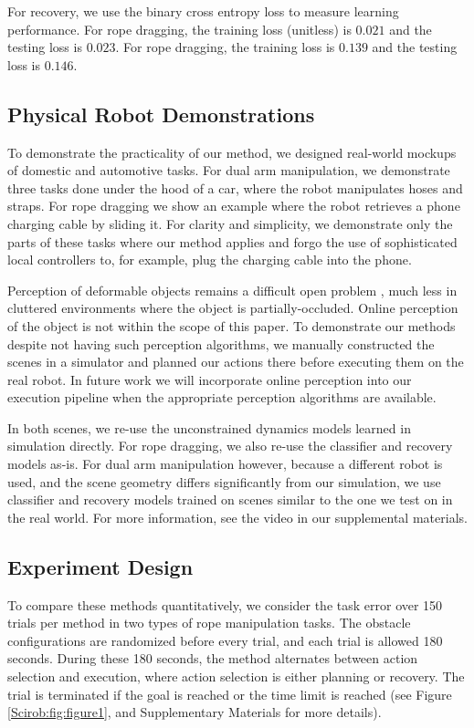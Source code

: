For recovery, we use the binary cross entropy loss to measure learning performance. For rope dragging, the training loss (unitless) is $0.021$ and the testing loss is $0.023$. For rope dragging, the training loss is $0.139$ and the testing loss is $0.146$. 

\subsection{Physical Robot Demonstrations}
\label{Scirob:sec:physical_robot_details}
To demonstrate the practicality of our method, we designed real-world mockups of domestic and automotive tasks. For dual arm manipulation, we demonstrate three tasks done under the hood of a car, where the robot manipulates hoses and straps. For rope dragging we show an example where the robot retrieves a phone charging cable by sliding it. For clarity and simplicity, we demonstrate only the parts of these tasks where our method applies and forgo the use of sophisticated local controllers to, for example, plug the charging cable into the phone.

Perception of deformable objects remains a difficult open problem \cite{Yan2020}, much less in cluttered environments where the object is partially-occluded. Online perception of the object is not within the scope of this paper. To demonstrate our methods despite not having such perception algorithms, we manually constructed the scenes in a simulator and planned our actions there before executing them on the real robot. In future work we will incorporate online perception into our execution pipeline when the appropriate perception algorithms are available.

In both scenes, we re-use the unconstrained dynamics models learned in simulation directly. For rope dragging, we also re-use the classifier and recovery models as-is. For dual arm manipulation however, because a different robot is used, and the scene geometry differs significantly from our simulation, we use classifier and recovery models trained on scenes similar to the one we test on in the real world.  For more information, see the video in our supplemental materials. 

\subsection{Experiment Design}
To compare these methods quantitatively, we consider the task error over 150 trials per method in two types of rope manipulation tasks. The obstacle configurations are randomized before every trial, and each trial is allowed 180 seconds. During these 180 seconds, the method alternates between action selection and execution, where action selection is either planning or recovery. The trial is terminated if the goal is reached or the time limit is reached (see Figure \ref{Scirob:fig:figure1}, and Supplementary Materials for more details).

